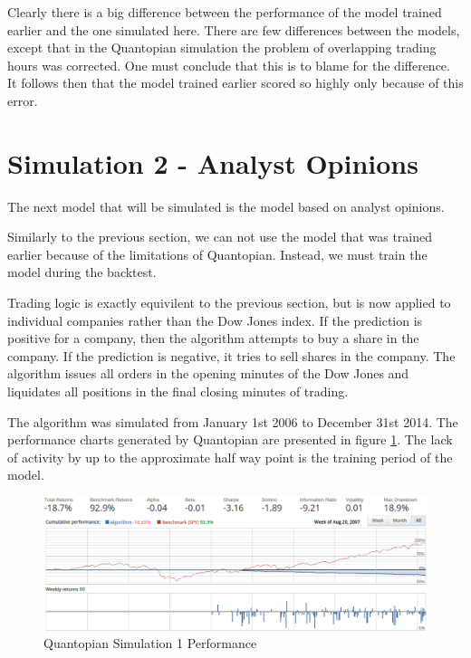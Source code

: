 \documentclass{report}
\begin{document}
Clearly there is a big difference between the performance of the model trained earlier and the one simulated here. There are few differences between the models, except that in the Quantopian simulation the problem of overlapping trading hours was corrected. One must conclude that this is to blame for the difference. It follows then that the model trained earlier scored so highly only because of this error.

\section{Simulation 2 - Analyst Opinions}

The next model that will be simulated is the model based on analyst opinions.

Similarly to the previous section, we can not use the model that was trained earlier because of the limitations of Quantopian. Instead, we must train the model during the backtest. 

Trading logic is exactly equivilent to the previous section, but is now applied to individual companies rather than the Dow Jones index. If the prediction is positive for a company, then the algorithm attempts to buy a share in the company. If the prediction is negative, it tries to sell shares in the company. The algorithm issues all orders in the opening minutes of the Dow Jones and liquidates all positions in the final closing minutes of trading.

The algorithm was simulated from January 1st 2006 to December 31st 2014. The performance charts generated by Quantopian are presented in figure \ref{fig:quantopian-2}. The lack of activity by up to the approximate half way point is the training period of the model.

\begin{figure}[H]
	\caption{Quantopian Simulation 1 Performance}
	\vspace{10pt}
	\centerline{\includegraphics[width=\textwidth]{vis/quantopian_analysts.png}}
	
	\label{fig:quantopian-2}
\end{figure}
\end{document}
